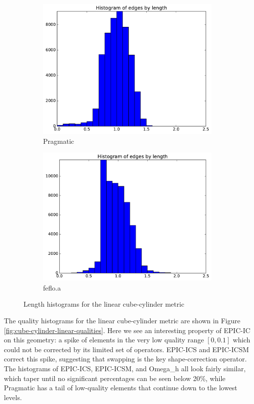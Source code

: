 \documentclass[3p,times,procedia,number]{elsarticle}
\begin{document}
\begin{figure}
\begin{subfigure}{.16\textwidth}
\includegraphics[width=\textwidth]{pragmatic-cube-cylinder-linear-length.pdf}
\caption{Pragmatic}
\end{subfigure}
\begin{subfigure}{.16\textwidth}
\centering
\includegraphics[width=\textwidth]{fefloa-cube-cylinder-linear-length.pdf}
\caption{feflo.a}
\end{subfigure}
\caption{Length histograms for the linear cube-cylinder metric}
\label{fig:cube-cylinder-linear-lengths}
\end{figure}

The quality histograms for the linear cube-cylinder metric
are shown in Figure \ref{fig:cube-cylinder-linear-qualities}.
Here we see an interesting property of EPIC-IC on this geometry:
a spike of elements in the very low quality range $[0,0.1]$
which could not be corrected by its limited set of operators.
EPIC-ICS and EPIC-ICSM correct this spike, suggesting that
swapping is the key shape-correction operator.
The histograms of EPIC-ICS, EPIC-ICSM, and Omega\_h all look fairly
similar, which taper until no significant percentages can be
seen below 20\%, while Pragmatic has a tail of low-quality
elements that continue down to the lowest levels.
\end{document}
